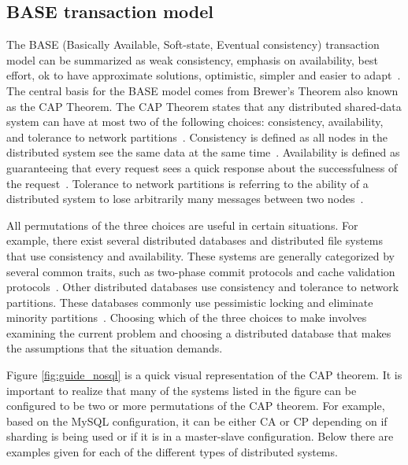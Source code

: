 \documentclass[12pt]{ucthesis}
\begin{document}
\subsection{BASE transaction model}
The BASE (Basically Available, Soft-state, Eventual consistency) transaction model can be summarized as weak consistency, emphasis on availability, best effort, ok to have approximate solutions, optimistic, simpler and easier to adapt~\cite{brewers_thm}. The central basis for the BASE model comes from Brewer's Theorem also known as the CAP Theorem. The CAP Theorem states that any distributed shared-data system can have at most two of the following choices: consistency, availability, and tolerance to network partitions~\cite{brewers_thm}. Consistency is defined as all nodes in the distributed system see the same data at the same time~\cite{brewers_conjecture}. Availability is defined as guaranteeing that every request sees a quick response about the successfulness of the request~\cite{brewers_conjecture}. Tolerance to network partitions is referring to the ability of a distributed system to lose arbitrarily many messages between two nodes~\cite{brewers_conjecture}.

All permutations of the three choices are useful in certain situations. For example, there exist several distributed databases and distributed file systems that use consistency and availability. These systems are generally categorized by several common traits, such as two-phase commit protocols and cache validation protocols~\cite{brewers_thm}. Other distributed databases use consistency and tolerance to network partitions. These databases commonly use pessimistic locking and eliminate minority partitions~\cite{brewers_thm}. Choosing which of the three choices to make involves examining the current problem and choosing a distributed database that makes the assumptions that the situation demands.

Figure \ref{fig:guide_nosql} is a quick visual representation of the CAP theorem. It is important to realize that many of the systems listed in the figure can be configured to be two or more permutations of the CAP theorem. For example, based on the MySQL configuration, it can be either CA or CP depending on if sharding is being used or if it is in a master-slave configuration. Below there are examples given for each of the different types of distributed systems.
\end{document}
